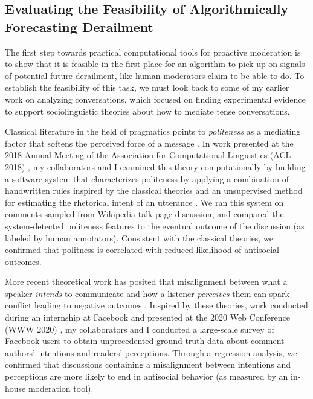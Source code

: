 \documentclass[11pt,letterpaper]{article}
\begin{document}
\subsection{Evaluating the Feasibility of Algorithmically Forecasting Derailment}
The first step towards practical computational tools for proactive moderation is to show that it is feasible in the first place for an algorithm to pick up on signals of potential future derailment, like human moderators claim to be able to do.
To establish the feasibility of this task, we must look back to some of my earlier work on analyzing conversations, which focused on finding experimental evidence to support sociolinguistic theories about how to mediate tense conversations.

Classical literature in the field of pragmatics points to \emph{politeness} as a mediating factor that softens the perceived force of a message \cite{brown_politeness:_1987}.
In work presented at the 2018 Annual Meeting of the Association for Computational Linguistics (ACL 2018) \cite{zhang_conversations_2018}, my collaborators and I examined this theory computationally by building a software system that characterizes politeness by applying a combination of handwritten rules inspired by the classical theories \cite{danescu-niculescu-mizil_computational_2013} and an unsupervised method for estimating the rhetorical intent of an utterance \cite{zhang_asking_2017}.
We ran this system on comments sampled from Wikipedia talk page discussion, and compared the system-detected politeness features to the eventual outcome of the discussion (as labeled by human annotators).
Consistent with the classical theories, we confirmed that politness is correlated with reduced likelihood of antisocial outcomes.

More recent theoretical work has posited that misalignment between what a speaker \emph{intends} to communicate and how a listener \emph{perceives} them can spark conflict leading to negative outcomes \cite{tannen_indirectness_2000}.
Inspired by these theories, work conducted during an internship at Facebook and presented at the 2020 Web Conference (WWW 2020) \cite{chang_dont_2020}, my collaborators and I conducted a large-scale survey of Facebook users to obtain unprecedented ground-truth data about comment authors' intentions and readers' perceptions.
Through a regression analysis, we confirmed that discussions containing a misalignment between intentions and perceptions are more likely to end in antisocial behavior (as measured by an in-house moderation tool).
\end{document}
